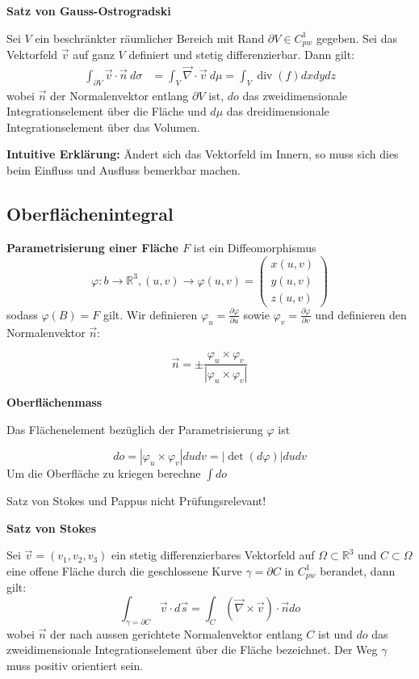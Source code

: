 \documentclass[25pt]{sciposter}
\newcommand{\R}{\mathbb{R}}
\newenvironment{method}[1]{\begin{mdframed}[backgroundcolor=blue!10,innertopmargin=15pt, innerbottommargin=15pt, nobreak=true]
		\textbf{#1 }
	}
	{ 
	\end{mdframed}
}
\newenvironment{important}{\begin{mdframed}[backgroundcolor=red!50,innertopmargin=15pt, innerbottommargin=15pt, nobreak=true]
		\Large
	}
	{ 
	\end{mdframed}
}
\begin{document}
\begin{multicols}{3}
\begin{method}{Satz von Gauss-Ostrogradski}
	Sei $V$ ein beschränkter räumlicher Bereich mit Rand $\partial V \in C^1_{pw}$ gegeben. Sei das Vektorfeld $\vec{v}$ auf ganz $V$ definiert und stetig differenzierbar. Dann gilt:
	\begin{align*}
		\int_{\partial V} \vec{v} \cdot \vec{n} \ d\sigma &= \int_{V} \vec{\nabla} \cdot \vec{v} \ d\mu = \int_V \operatorname{div} (f) dx dy dz
	\end{align*}
	wobei $\vec{n}$ der Normalenvektor entlang $\partial V$ ist, $do$ das zweidimensionale Integrationselement über die Fläche und $d\mu$ das dreidimensionale Integrationselement über das Volumen.
\end{method}

\textbf{Intuitive Erklärung: } Ändert sich das Vektorfeld im Innern, so muss sich dies beim Einfluss und Ausfluss bemerkbar machen.


\subsection*{Oberflächenintegral}
\textbf{Parametrisierung einer Fläche $F$} ist ein Diffeomorphismus $$\varphi:b \to \R^3, (u,v)\to\varphi(u,v) = \begin{pmatrix}
x(u,v)\\y(u,v)\\z(u,v)
\end{pmatrix}$$ sodass $\varphi(B) = F$ gilt. Wir definieren $\varphi_u = \frac{\partial \varphi}{\partial u}$ sowie 
$\varphi_v = \frac{\partial \varphi}{\partial v}$ und definieren den Normalenvektor $\vec{n}$:

$$\vec{n} = \pm \frac{\varphi_u \times \varphi_v}{|\varphi_u \times \varphi_v|}$$

\begin{method}{Oberflächenmass}
Das Flächenelement bezüglich der Parametrisierung $\varphi$ ist 

$$do = |\varphi_u \times \varphi_v|dudv = |\operatorname{det}(d\varphi)|dudv$$ Um die Oberfläche zu kriegen berechne $\int do$	
\end{method}

\ifx

\begin{important}
	Satz von Stokes und Pappus nicht Prüfungsrelevant!
\end{important}

\begin{method}{Satz von Stokes}
	Sei $\vec{v} = (v_1,v_2,v_3)$ ein stetig differenzierbares Vektorfeld auf $\Omega\subset \R^3$ und $C\subset \Omega$ eine offene Fläche durch die geschlossene Kurve $\gamma = \partial C$ in $C_{pw}^1$ berandet, dann gilt:
	$$\int_{\gamma = \partial C} \vec{v}\cdot d\vec{s} = \int_{C} (\vec{\nabla}\times \vec{v}) \cdot\vec{n} do$$ wobei $\vec{n}$ der nach aussen gerichtete Normalenvektor entlang $C$ ist und $do$ das zweidimensionale Integrationselement über die Fläche bezeichnet. Der Weg $\gamma$ muss positiv orientiert sein.
\end{method}


\end{multicols}
\end{document}
